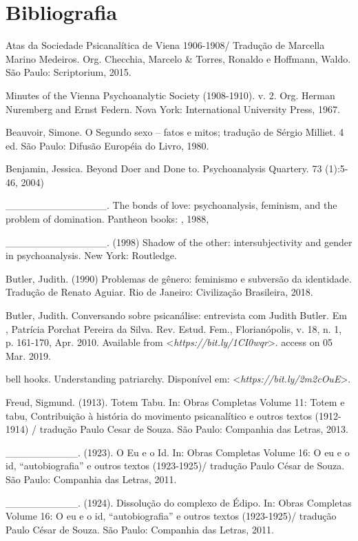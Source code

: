 \section{Bibliografia}

Atas da Sociedade Psicanalítica de Viena 1906-1908/ Tradução de Marcella
Marino Medeiros. Org. Checchia, Marcelo \& Torres, Ronaldo e Hoffmann,
Waldo. São Paulo: Scriptorium, 2015.

Minutes of the Vienna Psychoanalytic Society (1908-1910). v. 2. Org.
Herman Nuremberg and Ernst Federn. Nova York: International University
Press, 1967.

Beauvoir, Simone. O Segundo sexo -- fatos e mitos; tradução de Sérgio
Milliet. 4 ed. São Paulo: Difusão Européia do Livro, 1980.

Benjamin, Jessica. Beyond Doer and Done to. Psychoanalysis Quartery. 73
(1):5-46, 2004)

\_\_\_\_\_\_\_\_\_\_\_\_\_\_. The bonds of love: psychoanalysis,
feminism, and the problem of domination. Pantheon books: , 1988,

\_\_\_\_\_\_\_\_\_\_\_\_\_\_. (1998) Shadow of the other:
intersubjectivity and gender in psychoanalysis. New York: Routledge.

Butler, Judith. (1990) Problemas de gênero: feminismo e subversão da
identidade. Tradução de Renato Aguiar. Rio de Janeiro: Civilização
Brasileira, 2018.

Butler, Judith. Conversando sobre psicanálise: entrevista com Judith
Butler. Em , Patrícia Porchat Pereira da Silva. Rev. Estud. Fem.,
Florianópolis, v. 18, n. 1, p. 161-170, Apr. 2010. Available from
\textless{}\emph{https://bit.ly/1CI0wqr}\textgreater{}.
access on 05 Mar. 2019.

bell hooks. Understanding patriarchy. Disponível
em: \textless{}\emph{https://bit.ly/2m2cOuE}\textgreater{}.

Freud, Sigmund. (1913). Totem Tabu. In: Obras Completas Volume 11: Totem
e tabu, Contribuição à história do movimento psicanalítico e outros
textos (1912-1914) / tradução Paulo Cesar de Souza. São Paulo: Companhia
das Letras, 2013.

\_\_\_\_\_\_\_\_\_\_. (1923). O Eu e o Id. In: Obras Completas Volume
16: O eu e o id, ``autobiografia'' e outros textos (1923-1925)/ tradução
Paulo César de Souza. São Paulo: Companhia das Letras, 2011.

\_\_\_\_\_\_\_\_\_\_. (1924). Dissolução do complexo de Édipo. In: Obras
Completas Volume 16: O eu e o id, ``autobiografia'' e outros textos
(1923-1925)/ tradução Paulo César de Souza. São Paulo: Companhia das
Letras, 2011.

